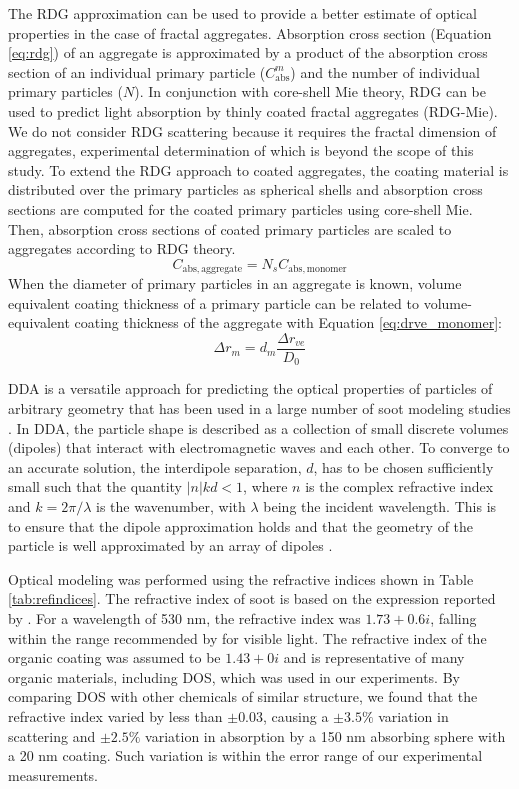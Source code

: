 \documentclass[12pt,authoryear]{elsarticle}
\begin{document}
The RDG approximation \citep{RN40,kerker2016scattering} can be used to provide a better estimate of optical properties in the case of fractal aggregates. Absorption cross section (Equation \ref{eq:rdg}) of an aggregate is approximated by a product of the absorption cross section of an individual primary particle ($C_\mathrm{abs}^m$) and the number of individual primary particles ($N$). In conjunction with core-shell Mie theory, RDG can be used to predict light absorption by thinly coated fractal aggregates (RDG-Mie). We do not consider RDG scattering because it requires the fractal dimension of aggregates, experimental determination of which is beyond the scope of this study. To extend the RDG approach to coated aggregates, the coating material is distributed over the primary particles as spherical shells and absorption cross sections are computed for the coated primary particles using core-shell Mie. Then, absorption cross sections of coated primary particles are scaled to aggregates according to RDG theory.
\begin{equation}
    C_\mathrm{abs,aggregate}=N_sC_\mathrm{abs,monomer}
    \label{eq:rdg}
\end{equation}
When the diameter of primary particles in an aggregate is known, volume equivalent coating thickness of a primary particle can be related to volume-equivalent coating thickness of the aggregate with Equation \ref{eq:drve_monomer}:
\begin{equation}
    \Delta r_{m}=d_m\frac{\Delta r_{ve}}{D_0}
    \label{eq:drve_monomer}
\end{equation}

DDA \citep{RN33} is a versatile approach for predicting the optical properties of particles of arbitrary geometry that has been used in a large number of soot modeling studies \citep{RN26,RN27,RN28}. In DDA, the particle shape is described as a collection of small discrete volumes (dipoles) that interact with electromagnetic waves and each other. To converge to an accurate solution, the interdipole separation, $d$, has to be chosen sufficiently small such that the quantity $|n|kd < 1$, where $n$ is the complex refractive index and $k = 2\pi/\lambda$ is the wavenumber, with $\lambda$ being the incident wavelength. This is to ensure that the dipole approximation holds \citep{RN29} and that the geometry of the particle is well approximated by an array of dipoles \citep{RN30}.

Optical modeling was performed using the refractive indices shown in Table \ref{tab:refindices}. The refractive index of soot is based on the expression reported by \citet{RN23}. For a wavelength of 530 nm, the refractive index was $1.73+0.6i$, falling within the range recommended by \citet{RN34} for visible light. The refractive index of the organic coating was assumed to be $1.43+0i$ and is representative of many organic materials, including DOS, which was used in our experiments. By comparing DOS with other chemicals of similar structure, we found that the refractive index varied by less than  $\pm0.03$, causing a $\pm 3.5\%$ variation in scattering and $\pm 2.5\%$ variation in absorption by a 150 nm absorbing sphere with a 20 nm coating. Such variation is within the error range of our experimental measurements.
\end{document}
